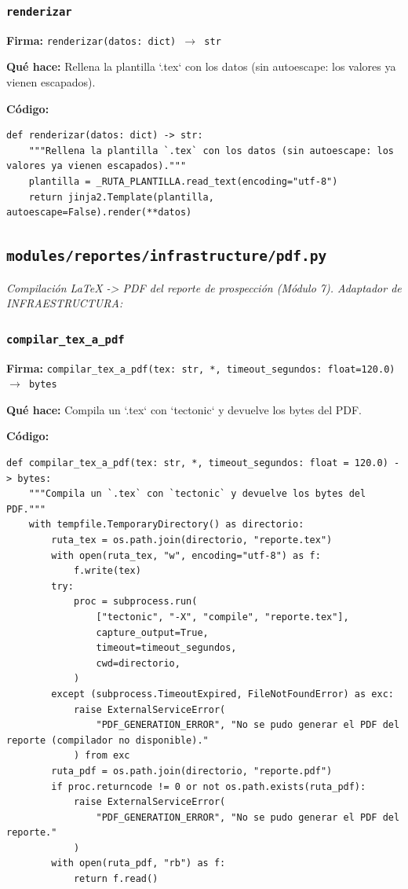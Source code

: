 \documentclass[11pt,a4paper]{article}
\begin{document}
\subsubsection*{\texttt{renderizar}}
\textbf{Firma:} \texttt{renderizar(datos: dict) $\rightarrow$ str}

\textbf{Qué hace:} Rellena la plantilla `.tex` con los datos (sin autoescape: los valores ya vienen escapados).

\textbf{Código:}
\begin{lstlisting}
def renderizar(datos: dict) -> str:
    """Rellena la plantilla `.tex` con los datos (sin autoescape: los valores ya vienen escapados)."""
    plantilla = _RUTA_PLANTILLA.read_text(encoding="utf-8")
    return jinja2.Template(plantilla, autoescape=False).render(**datos)
\end{lstlisting}

\subsection{\texttt{modules/reportes/infrastructure/pdf.py}}
\textit{Compilación LaTeX -> PDF del reporte de prospección (Módulo 7). Adaptador de INFRAESTRUCTURA:}

\subsubsection*{\texttt{compilar\_tex\_a\_pdf}}
\textbf{Firma:} \texttt{compilar\_tex\_a\_pdf(tex: str, *, timeout\_segundos: float=120.0) $\rightarrow$ bytes}

\textbf{Qué hace:} Compila un `.tex` con `tectonic` y devuelve los bytes del PDF.

\textbf{Código:}
\begin{lstlisting}
def compilar_tex_a_pdf(tex: str, *, timeout_segundos: float = 120.0) -> bytes:
    """Compila un `.tex` con `tectonic` y devuelve los bytes del PDF."""
    with tempfile.TemporaryDirectory() as directorio:
        ruta_tex = os.path.join(directorio, "reporte.tex")
        with open(ruta_tex, "w", encoding="utf-8") as f:
            f.write(tex)
        try:
            proc = subprocess.run(
                ["tectonic", "-X", "compile", "reporte.tex"],
                capture_output=True,
                timeout=timeout_segundos,
                cwd=directorio,
            )
        except (subprocess.TimeoutExpired, FileNotFoundError) as exc:
            raise ExternalServiceError(
                "PDF_GENERATION_ERROR", "No se pudo generar el PDF del reporte (compilador no disponible)."
            ) from exc
        ruta_pdf = os.path.join(directorio, "reporte.pdf")
        if proc.returncode != 0 or not os.path.exists(ruta_pdf):
            raise ExternalServiceError(
                "PDF_GENERATION_ERROR", "No se pudo generar el PDF del reporte."
            )
        with open(ruta_pdf, "rb") as f:
            return f.read()
\end{lstlisting}
\end{document}
